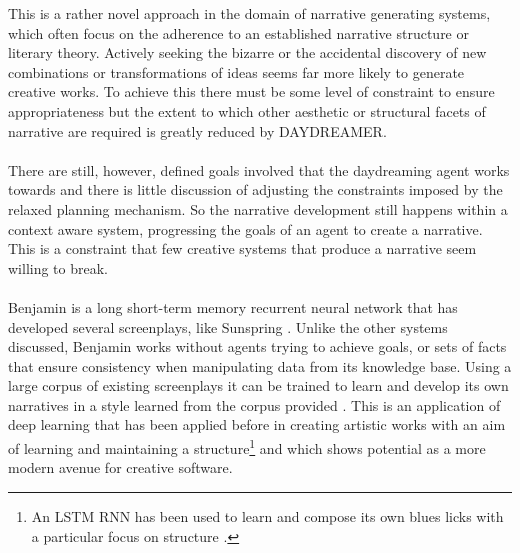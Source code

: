\documentclass[letterpaper]{article}
\begin{document}
This is a rather novel approach in the domain of narrative generating systems, which often focus on the adherence to an established narrative structure or literary theory. Actively seeking the bizarre or the accidental discovery of new combinations or transformations of ideas seems far more likely to generate creative works. To achieve this there must be some level of constraint to ensure appropriateness but the extent to which other aesthetic or structural facets of narrative are required is greatly reduced by DAYDREAMER.\\
\\There are still, however, defined goals involved that the daydreaming agent works towards and there is little discussion of adjusting the constraints imposed by the relaxed planning mechanism. So the narrative development still happens within a context aware system, progressing the goals of an agent to create a narrative. This is a constraint that few creative systems that produce a narrative seem willing to break.\\
\\Benjamin is a long short-term memory recurrent neural network that has developed several screenplays, like Sunspring \cite{SunspringScreenplay}. Unlike the other systems discussed, Benjamin works without agents trying to achieve goals, or sets of facts that ensure consistency when manipulating data from its knowledge base. Using a large corpus of existing screenplays it can be trained to learn and develop its own narratives in a style learned from the corpus provided \cite{githubUniverseTalk}. This is an application of deep learning that has been applied before in creating artistic works with an aim of learning and maintaining a structure\footnote{An LSTM RNN has been used to learn and compose its own blues licks with a particular focus on structure \cite{Eck2002}.} and which shows potential as a more modern avenue for creative software.\\
\end{document}
